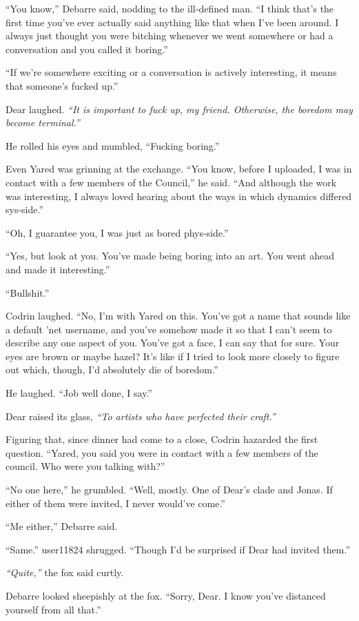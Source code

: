 ``You know,'' Debarre said, nodding to the ill-defined man. ``I think that's the first time you've ever actually said anything like that when I've been around. I always just thought you were bitching whenever we went somewhere or had a conversation and you called it boring.''

``If we're somewhere exciting or a conversation is actively interesting, it means that someone's fucked up.''

Dear laughed. \emph{``It is important to fuck up, my friend. Otherwise, the boredom may become terminal.''}

He rolled his eyes and mumbled, ``Fucking boring.''

Even Yared was grinning at the exchange. ``You know, before I uploaded, I was in contact with a few members of the Council,'' he said. ``And although the work was interesting, I always loved hearing about the ways in which dynamics differed sys-side.''

``Oh, I guarantee you, I was just as bored phys-side.''

``Yes, but look at you. You've made being boring into an art. You went ahead and made it interesting.''

``Bullshit.''

Codrin laughed. ``No, I'm with Yared on this. You've got a name that sounds like a default 'net username, and you've somehow made it so that I can't seem to describe any one aspect of you. You've got a face, I can say that for sure. Your eyes are brown or maybe hazel? It's like if I tried to look more closely to figure out which, though, I'd absolutely die of boredom.''

He laughed. ``Job well done, I say.''

Dear raised its glass, \emph{``To artists who have perfected their craft.''}

Figuring that, since dinner had come to a close, Codrin hazarded the first question. ``Yared, you said you were in contact with a few members of the council. Who were you talking with?''

``No one here,'' he grumbled. ``Well, mostly. One of Dear's clade and Jonas. If either of them were invited, I never would've come.''

``Me either,'' Debarre said.

``Same.'' user11824 shrugged. ``Though I'd be surprised if Dear had invited them.''

\emph{``Quite,''} the fox said curtly.

Debarre looked sheepishly at the fox. ``Sorry, Dear. I know you've distanced yourself from all that.''

